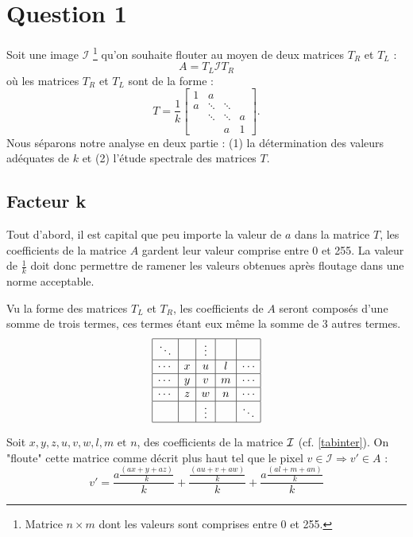 \section{Question 1}
Soit une image $\mathcal{I}$ \footnote{Matrice $n \times m$ dont les valeurs sont comprises entre 0 et 255.} qu'on souhaite flouter au moyen de deux matrices $T_R$ et $T_L$ : 
$$A=T_L \mathcal{I} T_R$$
où les matrices $T_R$ et $T_L$ sont de la forme : 
$$
 T = \frac{1}{k}
 \begin{bmatrix}
    1 & a 		& 			& \\
    a & \ddots 	& \ddots 	& \\
      & \ddots 	& \ddots 	& a \\
      & 		& a			& 1
  \end{bmatrix}.
$$
Nous séparons notre analyse en deux partie : (1) la détermination des valeurs adéquates de $k$ et (2) l'étude spectrale des matrices $T$.

\subsection{Facteur k}
Tout d'abord, il  est capital que peu importe la valeur de $\textit{a}$ dans la matrice $\textit{T}$,
les coefficients de la matrice $\textit{A}$ gardent leur valeur comprise entre 0 et 255.
La valeur de $\frac{1}{k}$ doit donc permettre de ramener les valeurs obtenues après floutage dans une norme acceptable.

Vu la forme des matrices $T_L$ et $T_R$, les coefficients de $A$ seront composés
d'une somme de trois termes,
ces termes étant eux même la somme de 3 autres termes.
$$
\begin{array}{|c|c|c|c|c|} 
\hline
\ddots & & \vdots & & \\
\hline
\cdots & x & u & l & \cdots\\
\hline
\cdots & y & v & m & \cdots \\
\hline
\cdots & z & w & n & \cdots \\
\hline
 & & \vdots & & \ddots \\
\hline
\end{array} \label{tabinter}
$$

Soit $x,y,z, u, v, w, l, m \text{ et } n$, des coefficients de la matrice $\mathcal{I}$ (cf. \ref{tabinter}). On "floute" cette matrice comme décrit plus haut tel que le pixel $v \in \mathcal{I} \Longrightarrow v' \in A$ : 
\begin{equation} \label{kGene}
  v' = \frac{a \frac{(ax+y+az)}{k}}{k} + \frac{\frac{(au+v+aw)}{k}}{k} + \frac{a \frac{(al+m+an)}{k}}{k}
\end{equation}

